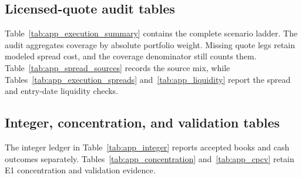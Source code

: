 \FloatBarrier
\subsection{Licensed-quote audit tables}\label{app:audit_tables}

Table~\ref{tab:app_execution_summary} contains the complete scenario ladder. The audit
aggregates coverage by absolute portfolio weight. Missing quote legs retain modeled spread
cost, and the coverage denominator still counts them.
Table~\ref{tab:app_spread_sources} records the source mix, while
Tables~\ref{tab:app_execution_spreads} and~\ref{tab:app_liquidity} report the spread and
entry-date liquidity checks.

\begin{table}[H]
\centering
\caption{Historical spread-source ladder by universe. The counts describe cost-evidence
rows, not orders or realized executions.}
\label{tab:app_spread_sources}

\end{table}

\begin{table}[H]
\centering
\caption{R1.1 CAGR, Sortino ratio, drawdown, and quote coverage under the modeled,
midpoint, touch-price, and worst-quote scenarios.}
\label{tab:app_execution_summary}
\small

\end{table}

\begin{table}[H]
\centering
\caption{Modeled and observed relative-spread quantiles by policy and quote regime.}
\label{tab:app_execution_spreads}
\resizebox{0.92\textwidth}{!}{}
\end{table}

\begin{table}[H]
\centering
\caption{Median entry-date participation and threshold breaches in the licensed-quote
audit.}
\label{tab:app_liquidity}
\small

\end{table}

\FloatBarrier
\subsection{Integer, concentration, and validation tables}

The integer ledger in Table~\ref{tab:app_integer} reports accepted books and cash outcomes
separately. Tables~\ref{tab:app_concentration} and~\ref{tab:app_cpcv} retain E1
concentration and validation evidence.

